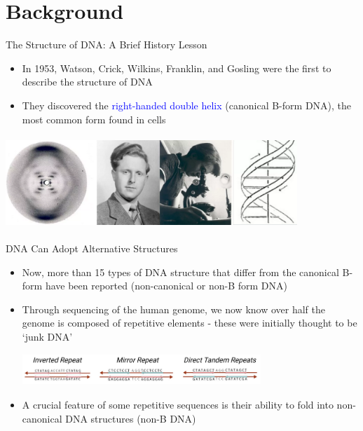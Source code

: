 \documentclass{beamer}
\begin{document}
	\section{Background}
	\begin{frame}{The Structure of DNA: A Brief History Lesson}
		\begin{itemize}
			\item In 1953, Watson, Crick, Wilkins, Franklin, and Gosling were the first to describe the structure of DNA \newline
			\item They discovered the \textcolor{blue}{right-handed double helix} (canonical B-form DNA), the most common form found in cells \newline
		\end{itemize}
		
		\centering
		\includegraphics[width=11cm, height=3.5cm]{rosy.png}
		
		
	\end{frame}
	
	\begin{frame}{DNA Can Adopt Alternative Structures}
		\label{link1}
		
		\begin{itemize}
			\item Now, more than 15 types of DNA structure that differ from the canonical B-form have been reported (non-canonical or non-B form DNA) \newline
			\item Through sequencing of the human genome, we now know over half the genome is composed of repetitive elements - these were initially thought to be `junk DNA' \newline
			
			\begin{center}
				\includegraphics[width=9cm, height=1.2cm]{repeats.png}
			\end{center}
			 
			\item A crucial feature of some repetitive sequences is their ability to fold into non-canonical DNA structures (non-B DNA)
		\end{itemize}
		
	\end{frame}
\end{document}
